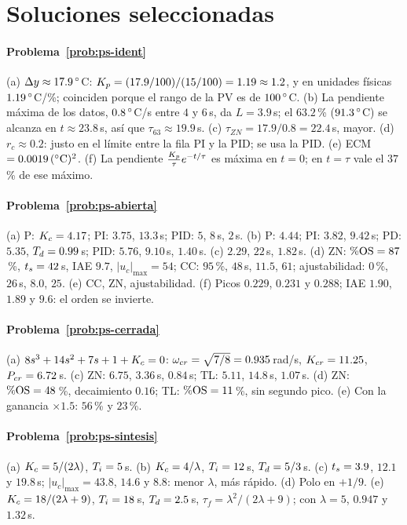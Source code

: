 \section{Soluciones seleccionadas}

\paragraph{Problema~\ref{prob:ps-ident}}
(a) $\Delta y\approx17.9\,^{\circ}$C: $K_p=(17.9/100)/(15/100)=1.19\approx1.2$, y en unidades físicas $1.19\,^{\circ}$C/\%; coinciden porque el rango de la PV es de $100\,^{\circ}$C. (b) La pendiente máxima de los datos, $0.8\,^{\circ}$C/s entre $4$ y $6$\,s, da $L=3.9$\,s; el $63.2$\,\% ($91.3\,^{\circ}$C) se alcanza en $t\approx23.8$\,s, así que $\tau_{63}\approx19.9$\,s. (c) $\tau_{ZN}=17.9/0.8=22.4$\,s, mayor. (d) $r_c\approx0.2$: justo en el límite entre la fila PI y la PID; se usa la PID. (e) ECM $=0.0019\,(^{\circ}\text{C})^2$. (f) La pendiente $\frac{K_p}{\tau}e^{-t/\tau}$ es máxima en $t=0$; en $t=\tau$ vale el $37$\,\% de ese máximo.

\paragraph{Problema~\ref{prob:ps-abierta}}
(a) P: $K_c=4.17$; PI: $3.75$, $13.3$\,s; PID: $5$, $8$\,s, $2$\,s. (b) P: $4.44$; PI: $3.82$, $9.42$\,s; PD: $5.35$, $T_d=0.99$\,s; PID: $5.76$, $9.10$\,s, $1.40$\,s. (c) $2.29$, $22$\,s, $1.82$\,s. (d) ZN: $\%\mathrm{OS}=87$\,\%, $t_s=42$\,s, IAE $9.7$, $|u_c|_{\max}=54$; CC: $95$\,\%, $48$\,s, $11.5$, $61$; ajustabilidad: $0$\,\%, $26$\,s, $8.0$, $25$. (e) CC, ZN, ajustabilidad. (f) Picos $0.229$, $0.231$ y $0.288$; IAE $1.90$, $1.89$ y $9.6$: el orden se invierte.

\paragraph{Problema~\ref{prob:ps-cerrada}}
(a) $8s^3+14s^2+7s+1+K_c=0$: $\omega_{cr}=\sqrt{7/8}=0.935$\,rad/s, $K_{cr}=11.25$, $P_{cr}=6.72$\,s. (c) ZN: $6.75$, $3.36$\,s, $0.84$\,s; TL: $5.11$, $14.8$\,s, $1.07$\,s. (d) ZN: $\%\mathrm{OS}=48$\,\%, decaimiento $0.16$; TL: $\%\mathrm{OS}=11$\,\%, sin segundo pico. (e) Con la ganancia $\times1.5$: $56$\,\% y $23$\,\%.

\paragraph{Problema~\ref{prob:ps-sintesis}}
(a) $K_c=5/(2\lambda)$, $T_i=5$\,s. (b) $K_c=4/\lambda$, $T_i=12$\,s, $T_d=5/3$\,s. (c) $t_s=3.9$, $12.1$ y $19.8$\,s; $|u_c|_{\max}=43.8$, $14.6$ y $8.8$: menor $\lambda$, más rápido. (d) Polo en $+1/9$. (e) $K_c=18/(2\lambda+9)$, $T_i=18$\,s, $T_d=2.5$\,s, $\tau_f=\lambda^2/(2\lambda+9)$; con $\lambda=5$, $0.947$ y $1.32$\,s.

